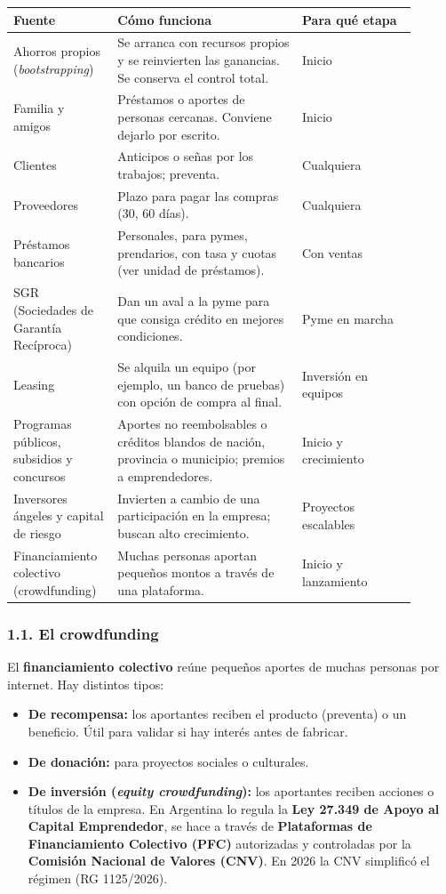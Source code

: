 \begin{center}
\small
\begin{tabular}{|p{0.22\linewidth}|p{0.42\linewidth}|p{0.26\linewidth}|}
\hline
\textbf{Fuente} & \textbf{Cómo funciona} & \textbf{Para qué etapa} \\ \hline
Ahorros propios (\textit{bootstrapping}) & Se arranca con recursos propios y se reinvierten
las ganancias. Se conserva el control total. & Inicio \\ \hline
Familia y amigos & Préstamos o aportes de personas cercanas. Conviene dejarlo por escrito. &
Inicio \\ \hline
Clientes & Anticipos o señas por los trabajos; preventa. & Cualquiera \\ \hline
Proveedores & Plazo para pagar las compras (30, 60 días). & Cualquiera \\ \hline
Préstamos bancarios & Personales, para pymes, prendarios, con tasa y cuotas (ver unidad de
préstamos). & Con ventas \\ \hline
SGR (Sociedades de Garantía Recíproca) & Dan un aval a la pyme para que consiga crédito en
mejores condiciones. & Pyme en marcha \\ \hline
Leasing & Se alquila un equipo (por ejemplo, un banco de pruebas) con opción de compra al
final. & Inversión en equipos \\ \hline
Programas públicos, subsidios y concursos & Aportes no reembolsables o créditos blandos de
nación, provincia o municipio; premios a emprendedores. & Inicio y crecimiento \\ \hline
Inversores ángeles y capital de riesgo & Invierten a cambio de una participación en la
empresa; buscan alto crecimiento. & Proyectos escalables \\ \hline
Financiamiento colectivo (crowdfunding) & Muchas personas aportan pequeños montos a través de
una plataforma. & Inicio y lanzamiento \\ \hline
\end{tabular}
\end{center}

\subsubsection*{1.1. El crowdfunding}
El \textbf{financiamiento colectivo} reúne pequeños aportes de muchas personas por internet.
Hay distintos tipos:
\begin{itemize}
  \item \textbf{De recompensa:} los aportantes reciben el producto (preventa) o un beneficio.
        Útil para validar si hay interés antes de fabricar.
  \item \textbf{De donación:} para proyectos sociales o culturales.
  \item \textbf{De inversión (\textit{equity crowdfunding}):} los aportantes reciben
        acciones o títulos de la empresa. En Argentina lo regula la \textbf{Ley 27.349 de
        Apoyo al Capital Emprendedor}, se hace a través de \textbf{Plataformas de
        Financiamiento Colectivo (PFC)} autorizadas y controladas por la \textbf{Comisión
        Nacional de Valores (CNV)}. En 2026 la CNV simplificó el régimen (RG 1125/2026).
\end{itemize}

